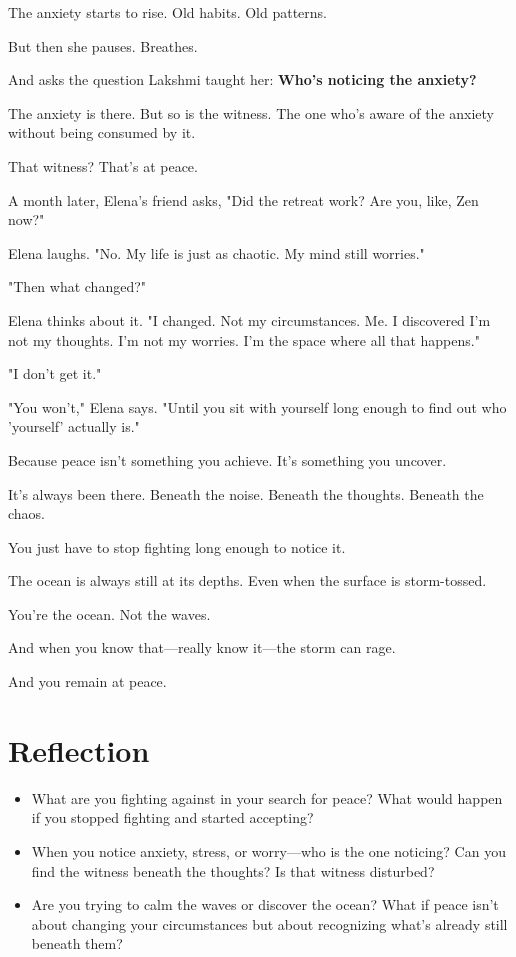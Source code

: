 \documentclass[11pt,twoside]{book}
\begin{document}
The anxiety starts to rise. Old habits. Old patterns.

But then she pauses. Breathes.

And asks the question Lakshmi taught her: \textbf{Who's noticing the anxiety?}

The anxiety is there. But so is the witness. The one who's aware of the anxiety without being consumed by it.

That witness? That's at peace.

A month later, Elena's friend asks, "Did the retreat work? Are you, like, Zen now?"

Elena laughs. "No. My life is just as chaotic. My mind still worries."

"Then what changed?"

Elena thinks about it. "I changed. Not my circumstances. Me. I discovered I'm not my thoughts. I'm not my worries. I'm the space where all that happens."

"I don't get it."

"You won't," Elena says. "Until you sit with yourself long enough to find out who 'yourself' actually is."

Because peace isn't something you achieve. It's something you uncover.

It's always been there. Beneath the noise. Beneath the thoughts. Beneath the chaos.

You just have to stop fighting long enough to notice it.

The ocean is always still at its depths. Even when the surface is storm-tossed.

You're the ocean. Not the waves.

And when you know that—really know it—the storm can rage.

And you remain at peace.

\section*{Reflection}

\begin{itemize}
\item What are you fighting against in your search for peace? What would happen if you stopped fighting and started accepting?
\item When you notice anxiety, stress, or worry—who is the one noticing? Can you find the witness beneath the thoughts? Is that witness disturbed?
\item Are you trying to calm the waves or discover the ocean? What if peace isn't about changing your circumstances but about recognizing what's already still beneath them?
\end{itemize}
\end{document}
